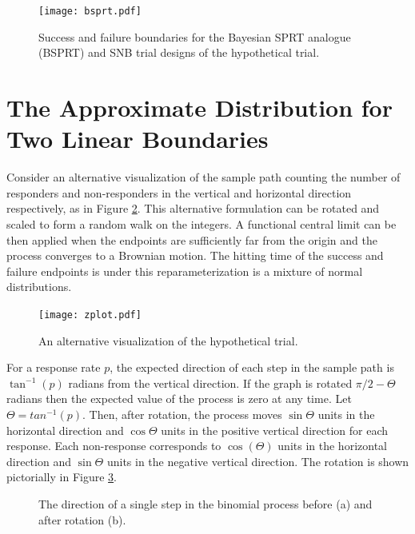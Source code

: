 \documentclass[12pt]{article}
\begin{document}
\begin{figure}[t!]
\centering
\texttt{[image: bsprt.pdf]}
\caption{
Success and failure boundaries for the Bayesian SPRT analogue (BSPRT) and SNB
trial designs of the hypothetical trial.
}
\label{fig:bsprt}
\end{figure}


\section{The Approximate Distribution for Two Linear Boundaries}

Consider an alternative visualization of the sample path counting the 
number of responders and non-responders in the vertical and horizontal 
direction respectively, as in Figure \ref{fig:zplot}. This alternative
formulation can be rotated and scaled to form a random walk on the integers.
A functional central limit can be then applied when the endpoints are 
sufficiently far from the origin and the process converges to a Brownian 
motion. The hitting time of the success and failure endpoints is under 
this reparameterization is a mixture of normal distributions.

\begin{figure}[t!]
\centering
\texttt{[image: zplot.pdf]}
\caption{
An alternative visualization of the hypothetical trial.
}
\label{fig:zplot}
\end{figure}

For a response rate $p$, the expected direction of each step in the sample 
path is $\tan^{-1}(p)$ radians from the vertical direction.
If the graph is rotated $\pi/2- \Theta$ radians then the 
expected value of the process is zero at any time.
Let $\Theta = tan^{-1}(p)$. Then, after rotation, the process moves 
$\sin \Theta$ units in the horizontal direction and $\cos \Theta$ units in 
the positive vertical direction for each response. Each non-response 
corresponds to $\cos (\Theta)$ units in the horizontal direction and 
$\sin \Theta$ units in the negative vertical direction. The rotation is shown 
pictorially in Figure \ref{fig:theta_rot}.

\begin{figure}[bp!] 
\centering
{}
\hfill
{}
\caption{
The direction of a single step in the binomial process before (a) and after
rotation (b).
}
\label{fig:theta_rot}
\end{figure}
\end{document}
